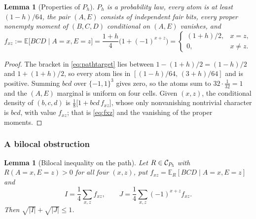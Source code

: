 \documentclass[11pt]{article}
\theoremstyle{plain}
\newtheorem{lemma}[theorem]{Lemma}
\theoremstyle{definition}
\newcommand{\E}{\mathbb E}
\begin{document}
\begin{lemma}[Properties of $P_h$]\label{lem:pathtarget}
$P_h$ is a probability law, every atom is at least $(1-h)/64$, the pair $(A,E)$ consists of independent fair bits, every proper nonempty moment of $(B,C,D)$ conditional on $(A,E)$ vanishes, and
\begin{equation}\label{eq:fxz}
f_{xz}:=\E\bigl[BCD\mid A=x,E=z\bigr]=\frac{1+h}4\bigl(1+(-1)^{x+z}\bigr)
=\begin{cases}(1+h)/2,&x=z,\\0,&x\ne z.\end{cases}
\end{equation}
\end{lemma}

\begin{proof}
The bracket in \eqref{eq:pathtarget} lies between $1-(1+h)/2=(1-h)/2$ and $1+(1+h)/2$, so every atom lies in $[(1-h)/64,\,(3+h)/64]$ and is positive. Summing $bcd$ over $\{-1,1\}^3$ gives zero, so the atoms sum to $32\cdot\frac1{32}=1$ and the $(A,E)$ marginal is uniform on four cells. Given $(x,z)$, the conditional density of $(b,c,d)$ is $\frac18\bigl[1+bcd\,f_{xz}\bigr]$, whose only nonvanishing nontrivial character is $bcd$, with value $f_{xz}$; that is \eqref{eq:fxz} and the vanishing of the proper moments.
\end{proof}

\subsubsection{A bilocal obstruction}\label{sec:bilocal}

\begin{lemma}[Bilocal inequality on the path]\label{lem:bilocal}
Let $R\in\mathcal C_{P_5}$ with $R(A=x,E=z)>0$ for all four $(x,z)$, put $f_{xz}=\E_R[BCD\mid A=x,E=z]$ and
\[
I=\frac14\sum_{x,z}f_{xz},\qquad J=\frac14\sum_{x,z}(-1)^{x+z}f_{xz}.
\]
Then $\sqrt{|I|}+\sqrt{|J|}\le1$.
\end{lemma}
\end{document}
